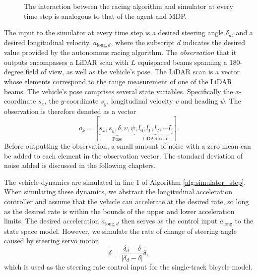 \begin{figure}[htb!]
    \centering
    
    \caption[The interaction between the ]{The interaction between the racing algorithm and simulator at every time step is analogous to that of the agent and MDP.}
    \label{fig:sim_mdp}
\end{figure}



The input to the simulator at every time step is a desired steering angle $\delta_d$, and a desired longitudinal velocity, $a_{\text{long},d}$, where the subscript $d$ indicates the desired value provided by the autonomous racing algorithm.
The \emph{observation} that it outputs encompasses a LiDAR scan with $L$ equispaced beams spanning a 180-degree field of view, as well as the vehicle's pose.
The LiDAR scan is a vector whose elements correspond to the range measurement of one of the LiDAR beams.
The vehicle's pose comprises several state variables.
Specifically the $x$-coordinate $s_x$, the $y$-coordinate $s_y$, longitudinal velocity $v$ and heading $\psi$.
The observation is therefore denoted as a vector
\begin{equation}
    o_k = [\underbrace{s_{x}, s_{y}, {\delta}, {\upsilon}, \psi}_{\text{Pose}}, \underbrace{l_0, l_1, l_2, \cdots L}_{\text{LiDAR scan}}].
\end{equation}
Before outputting the observation, a small amount of noise with a zero mean can be added to each element in the observation vector.
The standard deviation of noise added is discussed in the following chapters.




The vehicle dynamics are simulated in line 1 of Algorithm \ref{alg:simulator_step}.
When simulating these dynamics, we abstract the longitudinal acceleration controller and assume that the vehicle can accelerate at the desired rate, 
so long as the desired rate is within the bounds of the upper and lower acceleration limits.
The desired acceleration $a_{\text{long},d}$ then serves as the control input $a_{\text{long}}$ to the state space model. 
However, we simulate the rate of change of steering angle caused by steering servo motor,
\begin{equation}
    \dot{\delta} = \frac{\delta_d - \delta}{|\delta_d - \delta|} \overline{\dot{\delta}},
\label{eq:sim_servo}
\end{equation}
which is used as the steering rate control input for the single-track bicycle model.


